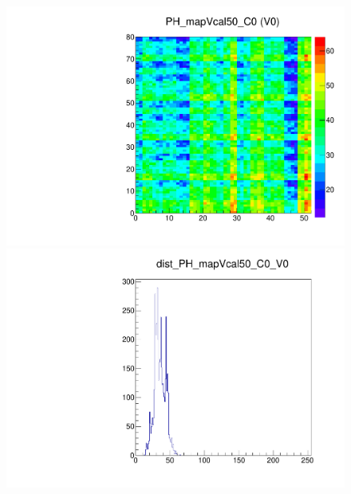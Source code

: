 \begin{figure}[!Hp]
\centering
\begin{minipage}{0.45\textwidth}
  \includegraphics[width=1.0\textwidth]{figures/phopt_PH_mapVcal50.pdf}
  \caption{}
  \label{fig:phopt_PH_mapVcal50}
\end{minipage}
\hspace{0.3cm}
\begin{minipage}{0.45\textwidth}
  \includegraphics[width=1.0\textwidth]{figures/phopt_dist_PH_mapVcal50.pdf}
  \caption{}
  \label{fig:phopt_dist_PH_mapVcal50}
\end{minipage}
\end{figure}

